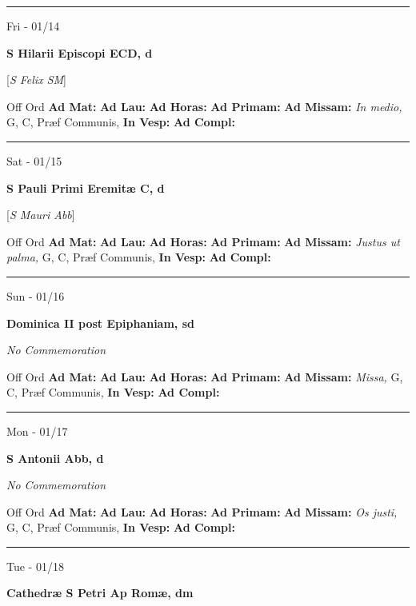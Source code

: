 \documentclass[letterpaper, 10pt]{article}
\begin{document}
\hrule
\begin{center}
Fri - 01/14
\end{center}\textbf{ \large S Hilarii Episcopi ECD, \textnormal{\normalsize d}}

[\textit{S Felix SM}]
\begin{justify}
Off Ord
\textbf{Ad Mat: }
\textbf{Ad Lau: }
\textbf{Ad Horas: }
\textbf{Ad Primam: }
\textbf{Ad Missam:} \textit{In medio, } G, C, Præf Communis, 
\textbf{In Vesp: }
\textbf{Ad Compl: }\end{justify}



\hrule
\begin{center}
Sat - 01/15
\end{center}\textbf{ \large S Pauli Primi Eremitæ C, \textnormal{\normalsize d}}

[\textit{S Mauri Abb}]
\begin{justify}
Off Ord
\textbf{Ad Mat: }
\textbf{Ad Lau: }
\textbf{Ad Horas: }
\textbf{Ad Primam: }
\textbf{Ad Missam:} \textit{Justus ut palma, } G, C, Præf Communis, 
\textbf{In Vesp: }
\textbf{Ad Compl: }\end{justify}



\hrule
\begin{center}
Sun - 01/16
\end{center}\textbf{ \large Dominica II post Epiphaniam, \textnormal{\normalsize sd}}

\textit{No Commemoration}\begin{justify}
Off Ord
\textbf{Ad Mat: }
\textbf{Ad Lau: }
\textbf{Ad Horas: }
\textbf{Ad Primam: }
\textbf{Ad Missam:} \textit{Missa, } G, C, Præf Communis, 
\textbf{In Vesp: }
\textbf{Ad Compl: }\end{justify}



\hrule
\begin{center}
Mon - 01/17
\end{center}\textbf{ \large S Antonii Abb, \textnormal{\normalsize d}}

\textit{No Commemoration}\begin{justify}
Off Ord
\textbf{Ad Mat: }
\textbf{Ad Lau: }
\textbf{Ad Horas: }
\textbf{Ad Primam: }
\textbf{Ad Missam:} \textit{Os justi, } G, C, Præf Communis, 
\textbf{In Vesp: }
\textbf{Ad Compl: }\end{justify}



\hrule
\begin{center}
Tue - 01/18
\end{center}\textbf{ \large Cathedræ S Petri Ap Romæ, \textnormal{\normalsize dm}}
\end{document}

